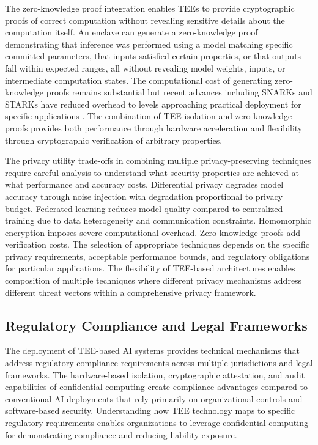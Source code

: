 The zero-knowledge proof integration enables TEEs to provide cryptographic proofs of correct computation without revealing sensitive details about the computation itself. An enclave can generate a zero-knowledge proof demonstrating that inference was performed using a model matching specific committed parameters, that inputs satisfied certain properties, or that outputs fall within expected ranges, all without revealing model weights, inputs, or intermediate computation states. The computational cost of generating zero-knowledge proofs remains substantial but recent advances including SNARKs and STARKs have reduced overhead to levels approaching practical deployment for specific applications \cite{zero_knowledge}. The combination of TEE isolation and zero-knowledge proofs provides both performance through hardware acceleration and flexibility through cryptographic verification of arbitrary properties.

The privacy utility trade-offs in combining multiple privacy-preserving techniques require careful analysis to understand what security properties are achieved at what performance and accuracy costs. Differential privacy degrades model accuracy through noise injection with degradation proportional to privacy budget. Federated learning reduces model quality compared to centralized training due to data heterogeneity and communication constraints. Homomorphic encryption imposes severe computational overhead. Zero-knowledge proofs add verification costs. The selection of appropriate techniques depends on the specific privacy requirements, acceptable performance bounds, and regulatory obligations for particular applications. The flexibility of TEE-based architectures enables composition of multiple techniques where different privacy mechanisms address different threat vectors within a comprehensive privacy framework.

\subsection{Regulatory Compliance and Legal Frameworks}

The deployment of TEE-based AI systems provides technical mechanisms that address regulatory compliance requirements across multiple jurisdictions and legal frameworks. The hardware-based isolation, cryptographic attestation, and audit capabilities of confidential computing create compliance advantages compared to conventional AI deployments that rely primarily on organizational controls and software-based security. Understanding how TEE technology maps to specific regulatory requirements enables organizations to leverage confidential computing for demonstrating compliance and reducing liability exposure.

